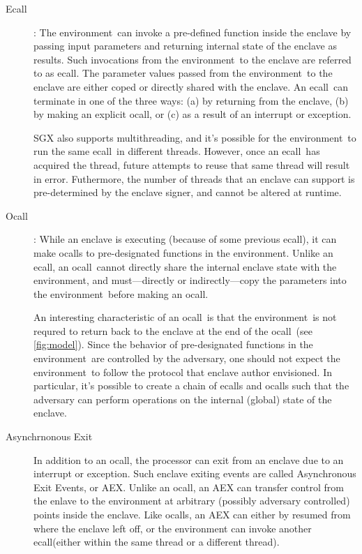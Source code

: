\documentclass[11pt]{article}
\newcommand{\ecall}{\textsf{ecall}}
\newcommand{\ocall}{\textsf{ocall}}
\newcommand{\env}{\textsf{environment}}
\begin{document}
  \begin{description}
  \item[Ecall]: The \env\ can invoke a pre-defined function inside the
    enclave by passing input parameters and returning internal state
    of the enclave as results. Such invocations from the \env\ to the
    enclave are referred to as \ecall. The parameter values passed
    from the \env\ to the enclave are either coped or directly shared
    with the enclave. An \ecall\ can terminate in one of the three
    ways: (a) by returning from the enclave, (b) by making an explicit
    \ocall, or (c) as a result of an interrupt or exception.

    SGX also supports multithreading, and it's possible for the
    \env\ to run the same \ecall\ in different threads. However, once
    an \ecall\ has acquired the thread, future attempts to reuse that
    same thread will result in error. Futhermore, the number of
    threads that an enclave can support is pre-determined by the
    enclave signer, and cannot be altered at runtime.

  \item [Ocall]: While an enclave is executing (because of some
    previous \ecall), it can make \ocall s  to pre-designated
    functions in the \env.  Unlike an \ecall, an \ocall\ cannot
    directly share the internal enclave state with the \env, and
    must---directly or indirectly---copy the parameters into the
    \env\ before making an \ocall.

    An interesting characteristic of an \ocall\ is that the \env\ is
    not requred to return back to the enclave at the end of the
    \ocall\ (see \ref{fig:model}). Since the behavior of pre-designated
    functions in the \env\ are controlled by the adversary, one should
    not expect the \env\ to follow the protocol that enclave author
    envisioned. In particular, it's possible to create a chain of
    \ecall s and \ocall s such that the adversary can perform
    operations on the internal (global) state of the enclave.

  \item[Asynchrnonous Exit] In addition to an \ocall, the
    processor can exit from an enclave due to an interrupt or
    exception. Such enclave exiting events are called Asynchronous
    Exit Events, or AEX. Unlike an \ocall, an AEX can transfer control
    from the enlave to the environment at arbitrary (possibly adversary
    controlled) points inside the enclave. Like \ocall s, an AEX can
    either by resumed from where the enclave left off, or the
    environment can invoke another \ecall (either within the same
    thread or a different thread).
  \end{description}
\end{document}

